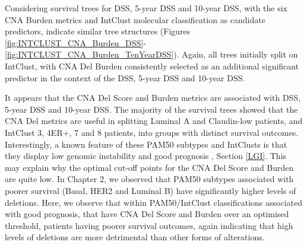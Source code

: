 Considering survival trees for DSS, 5-year DSS and 10-year DSS, with the six CNA Burden metrics and IntClust molecular classification as candidate predictors, indicate similar tree structures (Figures \ref{fig:INTCLUST_CNA_Burden_DSS}-\ref{fig:INTCLUST_CNA_Burden_TenYearDSS}). Again, all trees initially split on IntClust, with CNA Del Burden consistently selected as an additional significant predictor in the context of the DSS, 5-year DSS and 10-year DSS. 

It appears that the CNA Del Score and Burden metrics are associated with DSS, 5-year DSS and 10-year DSS. The majority of the survival trees showed that the CNA Del metrics are useful in splitting Luminal A and Claudin-low patients, and IntClust 3, 4ER+, 7 and 8 patients, into groups with distinct survival outcomes. Interestingly, a known feature of these PAM50 subtypes and IntClusts is that they display low genomic instability and good prognosis \citep{pmid22522925}, Section \ref{LGI}. This may explain why the optimal cut-off points for the CNA Del Score and Burden are quite low. In Chapter 2, we observed that PAM50 subtypes associated with poorer survival (Basal, HER2 and Luminal B) have significantly higher levels of deletions. Here, we observe that within PAM50/IntClust classifications associated with good prognosis, that have CNA Del Score and Burden over an optimised threshold, patients having poorer survival outcomes, again indicating that high levels of deletions are more detrimental than other forms of alterations.

